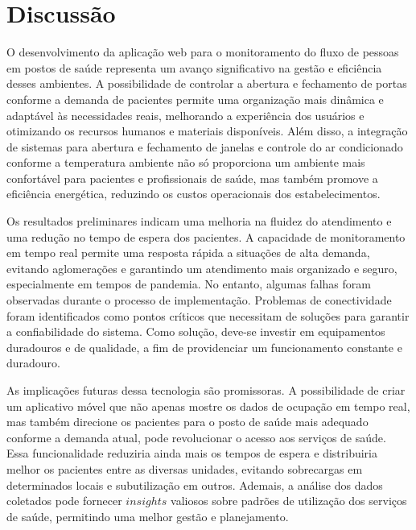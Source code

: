 \documentclass[conference, a4paper, 12pt]{IEEEtran}
\begin{document}
\section{Discussão}
\label{sec:discussion}
  O desenvolvimento da aplicação web para o monitoramento do fluxo de pessoas em postos de saúde representa um avanço significativo na gestão e eficiência desses ambientes. A possibilidade de controlar a abertura e fechamento de portas conforme a demanda de pacientes permite uma organização mais dinâmica e adaptável às necessidades reais, melhorando a experiência dos usuários e otimizando os recursos humanos e materiais disponíveis. Além disso, a integração de sistemas para abertura e fechamento de janelas e controle do ar condicionado conforme a temperatura ambiente não só proporciona um ambiente mais confortável para pacientes e profissionais de saúde, mas também promove a eficiência energética, reduzindo os custos operacionais dos estabelecimentos.

  Os resultados preliminares indicam uma melhoria na fluidez do atendimento e uma redução no tempo de espera dos pacientes. A capacidade de monitoramento em tempo real permite uma resposta rápida a situações de alta demanda, evitando aglomerações e garantindo um atendimento mais organizado e seguro, especialmente em tempos de pandemia. No entanto, algumas falhas foram observadas durante o processo de implementação. Problemas de conectividade foram identificados como pontos críticos que necessitam de soluções para garantir a confiabilidade do sistema. Como solução, deve-se investir em equipamentos duradouros e de qualidade, a fim de providenciar um funcionamento constante e duradouro.

  As implicações futuras dessa tecnologia são promissoras. A possibilidade de criar um aplicativo móvel que não apenas mostre os dados de ocupação em tempo real, mas também direcione os pacientes para o posto de saúde mais adequado conforme a demanda atual, pode revolucionar o acesso aos serviços de saúde. Essa funcionalidade reduziria ainda mais os tempos de espera e distribuiria melhor os pacientes entre as diversas unidades, evitando sobrecargas em determinados locais e subutilização em outros. Ademais, a análise dos dados coletados pode fornecer $insights$ valiosos sobre padrões de utilização dos serviços de saúde, permitindo uma melhor gestão e planejamento.
\end{document}
